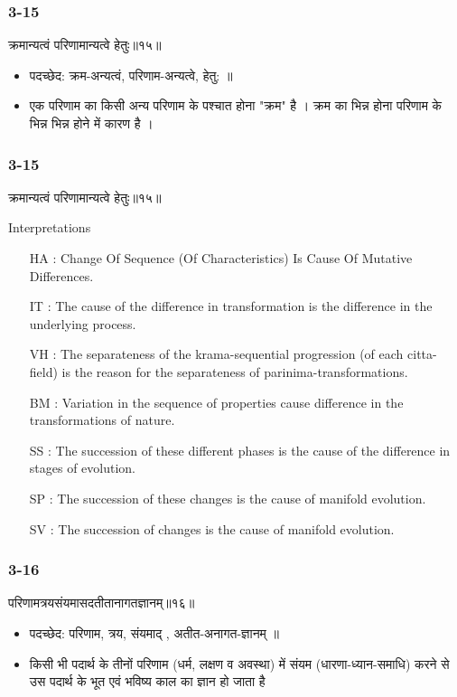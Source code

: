 \begin{frame}[fragile]\frametitle{3-15}
\begin{sanskrit}
क्रमान्यत्वं परिणामान्यत्वे हेतुः॥१५॥
\end{sanskrit}

\begin{itemize}
\item पदच्छेद: क्रम-अन्यत्वं, परिणाम-अन्यत्वे, हेतु: ॥
\item एक परिणाम का किसी अन्य परिणाम के पश्चात होना "क्रम" है । क्रम का भिन्न होना परिणाम के भिन्न भिन्न होने में कारण है ।
\end{itemize}
\end{frame}


\begin{frame}[fragile]\frametitle{3-15}
\begin{sanskrit}
क्रमान्यत्वं परिणामान्यत्वे हेतुः॥१५॥
\end{sanskrit}

Interpretations
\begin{itemize}	
\item [HA]: Change Of Sequence (Of Characteristics) Is Cause Of Mutative Differences.
\item [IT]: The cause of the difference in transformation is the difference in the underlying process.
\item [VH]: The separateness of the krama-sequential progression (of each citta-field) is the reason for the separateness of parinima-transformations.
\item [BM]: Variation in the sequence of properties cause difference in the transformations of nature.
\item [SS]: The succession of these different phases is the cause of the difference in stages of evolution.
\item [SP]: The succession of these changes is the cause of manifold evolution.
\item [SV]: The succession of changes is the cause of manifold evolution. 
\end{itemize}
\end{frame}


\begin{frame}[fragile]\frametitle{3-16}
\begin{sanskrit}
परिणामत्रयसंयमासदतीतानागतज्ञानम्॥१६॥
\end{sanskrit}

\begin{itemize}
\item पदच्छेद: परिणाम, त्रय, संयमाद् , अतीत-अनागत-ज्ञानम् ॥
\item किसी भी पदार्थ के तीनों परिणाम (धर्म, लक्षण व अवस्था) में संयम (धारणा-ध्यान-समाधि) करने से उस पदार्थ के भूत एवं भविष्य काल का ज्ञान हो जाता है
\end{itemize}
\end{frame}

